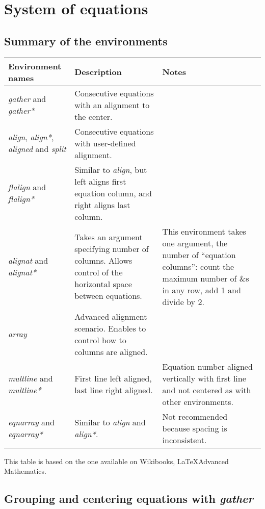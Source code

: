 \documentclass{article}
\begin{document}
\section*{System of equations}


\subsection*{Summary of the environments}

\begin{table}[h]
	\begin{tabularx}{\textwidth}{| X | X | X |}
	\hline
	\textbf{Environment names} & \textbf{Description} & \textbf{Notes} \\
	\hline
	\emph{gather} and \emph{gather*} & Consecutive equations with an alignment to the center. & \\
	\hline
	\emph{align}, \emph{align*}, \emph{aligned} and \emph{split} & Consecutive equations with user-defined alignment. & \\
	\hline
	\emph{flalign} and \emph{flalign*} & Similar to \emph{align}, but left aligns first equation column, and right aligns last column. & \\
	\hline
	\emph{alignat} and \emph{alignat*} & Takes an argument specifying number of columns. Allows control of the horizontal space between equations. & This environment takes one argument, the number of “equation columns”: count the maximum number of \&s in any row, add 1 and divide by 2. \\
	\hline
	\emph{array} & Advanced alignment scenario. Enables to control how to columns are aligned. & \\
	\hline
	\emph{multline} and \emph{multline*} & First line left aligned, last line right aligned. & Equation number aligned vertically with first line and not centered as with other environments. \\
	\hline
	\emph{eqnarray} and \emph{eqnarray*} & Similar to \emph{align} and \emph{align*}. & Not recommended because spacing is inconsistent. \\
	\hline
	\end{tabularx}
\end{table}

This table is based on the one available on Wikibooks, \LaTeX Advanced Mathematics.

\newpage


\subsection*{Grouping and centering equations with \emph{gather}}
\end{document}
